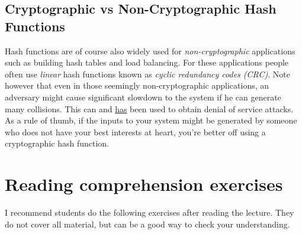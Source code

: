 \subsection{Cryptographic vs Non-Cryptographic Hash
Functions}\label{7-Cryptographic-vs-Non-C}

Hash functions are of course also widely used for
\emph{non-cryptographic} applications such as building hash tables and
load balancing. For these applications people often use \emph{linear}
hash functions known as \emph{cyclic redundancy codes (CRC)}. Note
however that even in those seemingly non-cryptographic applications, an
adversary might cause significant slowdown to the system if he can
generate many collisions. This can and
\href{http://arstechnica.com/business/2011/12/huge-portions-of-web-vulnerable-to-hashing-denial-of-service-attack/}{has}
been used to obtain denial of service attacks. As a rule of thumb, if
the inputs to your system might be generated by someone who does not
have your best interests at heart, you're better off using a
cryptographic hash function.

\section{Reading comprehension
exercises}\label{7-Reading-comprehension-}

I recommend students do the following exercises after reading the
lecture. They do not cover all material, but can be a good way to check
your understanding.


